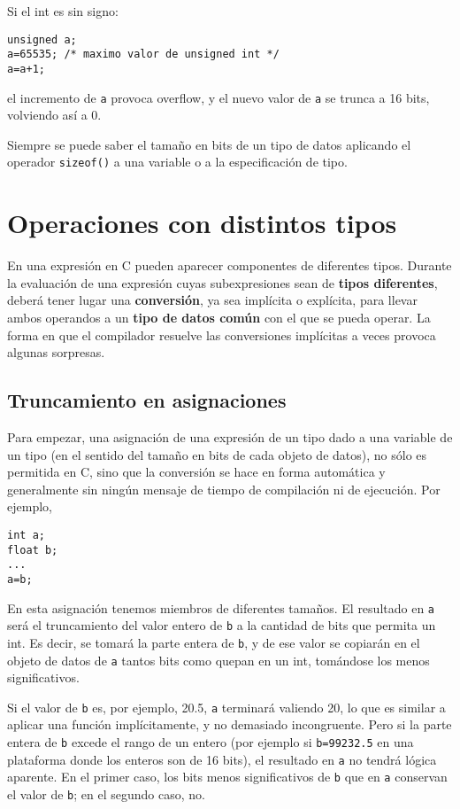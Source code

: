 Si el int es sin signo:

\begin{lstlisting}
unsigned a;
a=65535; /* maximo valor de unsigned int */
a=a+1; 
\end{lstlisting}

el incremento de \lstinline{a} provoca overflow, y el nuevo valor de \lstinline{a} se trunca a 16 bits, volviendo así a 0.

Siempre se puede saber el tamaño en bits de un tipo de datos aplicando el operador \lstinline{sizeof()} a una
variable o a la especificación de tipo.

\section{Operaciones con distintos tipos}

En una expresión en C pueden aparecer componentes de diferentes tipos. Durante la evaluación de una
expresión cuyas subexpresiones sean de \textbf{tipos diferentes}, deberá tener lugar una \textbf{conversión}, ya sea
implícita o explícita, para llevar ambos operandos a un \textbf{tipo de datos común} con el que se pueda
operar. La forma en que el compilador resuelve las conversiones implícitas a veces provoca algunas
sorpresas.

\subsection{Truncamiento en asignaciones}

Para empezar, una asignación de una expresión de un tipo dado a una variable de un tipo  (en el sentido
del tamaño en bits de cada objeto de datos), no
sólo es permitida en C, sino que la conversión se hace en forma automática y generalmente sin ningún
mensaje de tiempo de compilación ni de ejecución. Por ejemplo,
\begin{lstlisting}
int a;
float b;
...
a=b;
\end{lstlisting}

En esta asignación tenemos miembros de diferentes tamaños. El resultado en \lstinline{a} será el truncamiento
del valor entero de \lstinline{b} a la cantidad de bits que permita un int. Es decir, se tomará la parte entera de \lstinline{b}, y
de ese valor se copiarán en el objeto de datos de \lstinline{a} tantos bits como quepan en un int, tomándose
los menos significativos.

Si el valor de \lstinline{b} es, por ejemplo, 20.5, \lstinline{a} terminará valiendo 20, lo que es similar a aplicar una función
 implícitamente, y no demasiado incongruente. Pero si la parte entera de \lstinline{b} excede el
rango de un entero (por ejemplo si \lstinline{b=99232.5} en una plataforma donde los enteros son de 16 bits), el resultado en \lstinline{a} no tendrá lógica aparente. En el primer caso, los bits menos significativos de \lstinline{b} que  en \lstinline{a} conservan el valor de \lstinline{b}; en el segundo caso, no.

